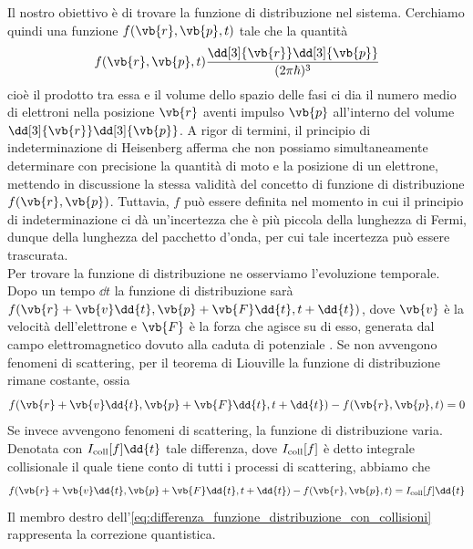 Il nostro obiettivo è di trovare la funzione di distribuzione nel sistema. Cerchiamo quindi una funzione $f(\vb{r},\vb{p},t)$ tale che la quantità
\begin{equation*}
    f(\vb{r},\vb{p},t) \frac{\dd[3]{\vb{r}} \dd[3]{\vb{p}}}{(2 \pi \hbar)^3}
\end{equation*}
cioè il prodotto tra essa e il volume dello spazio delle fasi ci dia il numero medio di elettroni nella posizione $\vb{r}$ aventi impulso $\vb{p}$ all'interno del volume $\dd[3]{\vb{r}} \dd[3]{\vb{p}}$.
A rigor di termini, il principio di indeterminazione di Heisenberg afferma che non possiamo simultaneamente determinare con precisione la quantità di moto e la posizione di un elettrone, mettendo in discussione la stessa validità del concetto di funzione di distribuzione $f(\vb{r}, \vb{p})$. Tuttavia, $f$ può essere definita nel momento in cui il principio di indeterminazione ci dà un'incertezza che è più piccola della lunghezza di Fermi, dunque della lunghezza del pacchetto d'onda, per cui tale incertezza può essere trascurata.\\
Per trovare la funzione di distribuzione ne osserviamo l'evoluzione temporale. Dopo un tempo $\dd{t}$ la funzione di distribuzione sarà $f(\vb{r} + \vb{v} \dd{t}, \vb{p} + \vb{F} \dd{t}, t + \dd{t})$, dove $\vb{v}$ è la velocità dell'elettrone e $\vb{F}$ è la forza che agisce su di esso, generata dal campo elettromagnetico dovuto alla caduta di potenziale
. Se non avvengono fenomeni di scattering, per il teorema di Liouville la funzione di distribuzione rimane costante, ossia
\begin{equation*}
    f(\vb{r} + \vb{v} \dd{t}, \vb{p} + \vb{F} \dd{t}, t + \dd{t}) - f(\vb{r}, \vb{p}, t)
    =0
\end{equation*}
Se invece avvengono fenomeni di scattering, la funzione di distribuzione varia. Denotata con $I_{\rm coll}[f] \dd{t}$ tale differenza, dove $I_{\rm coll}[f]$ è detto integrale collisionale il quale tiene conto di tutti i processi di scattering, abbiamo che
\begin{equation}
    f(\vb{r} + \vb{v} \dd{t}, \vb{p} + \vb{F} \dd{t}, t + \dd{t}) - f(\vb{r}, \vb{p}, t)
    =I_{\rm coll}[f] \dd{t}
    \label{eq:differenza_funzione_distribuzione_con_collisioni}
\end{equation}
Il membro destro dell'\eqref{eq:differenza_funzione_distribuzione_con_collisioni} rappresenta la correzione quantistica.\\

